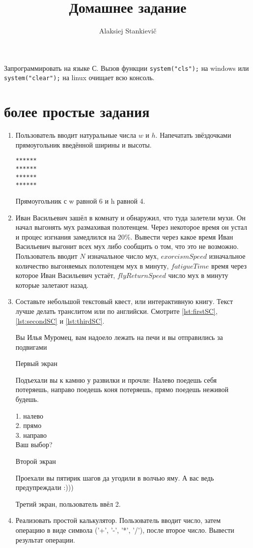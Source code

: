 \documentclass[12pt]{article}
\author{Alaksiej Stankievič}
\title{Домашнее задание}
\begin{document}

 Запрограммировать на языке С. Вызов функции \verb|system("cls");| на windows или \verb|system("clear");| на  linux очищает всю консоль.
 \section{более простые задания}
 \begin{enumerate}
  \item Пользователь вводит натуральные числа $w$ и $h$. Напечатать звёздочками прямоугольник введённой ширины и высоты.
  \begin{listing}[h]
\begin{center}
\begin{verbatim}
******
******
******
******
\end{verbatim}
\end{center}

\caption{Прямоугольник с w равной 6 и h равной 4.}
\end{listing}
  \item Иван Васильевич зашёл в комнату и обнаружил, что туда залетели мухи. Он начал выгонять мух размахивая полотенцем. Через некоторое время он устал и процес изгнания замедлился на 20\%. Вывести через какое время Иван Васильевич выгонит всех мух либо сообщить о том, что это не возможно. Пользователь вводит $N$ изначальное число мух, $exorcismSpeed$ изначальное количество выгоняемых полотенцем мух в минуту, $fatigueTime$ время через которое Иван Васильевич устаёт, $flyReturnSpeed$ число мух в минуту которые залетают назад.
  \item Составьте небольшой текстовый квест, или интерактивную книгу. Текст лучше делать транслитом или по английски. Смотрите \ref{lst:firstSC}, \ref{lst:secondSC} и \ref{lst:thirdSC}.
    \begin{listing}[h]
Вы Илья Муромец, вам надоело лежать на печи и вы отправились за подвигами
\caption{Первый экран}
\label{lst:firstSC}
\end{listing}
\begin{listing}[h]
Подъехали вы к камню у развилки и прочли:
Налево поедешь себя потеряешь, направо поедешь коня потеряешь,
прямо поедешь неживой будешь.

1. налево\\
2. прямо\\
3. направо\\
Ваш выбор?
\caption{Второй экран}
\label{lst:secondSC}
\end{listing}
\begin{listing}[h]
Проехали вы пятирик шагов да угодили в волчью яму. А вас ведь предупреждали :)))
\caption{Третий экран, пользователь ввёл 2.}
\label{lst:thirdSC}
\end{listing}
  \item Реализовать простой калькулятор. Пользователь вводит число, затем операцию в виде символа ('+', '-', '*', '/'), после второе число. Вывести результат операции.
 \end{enumerate}
 
\end{document}
